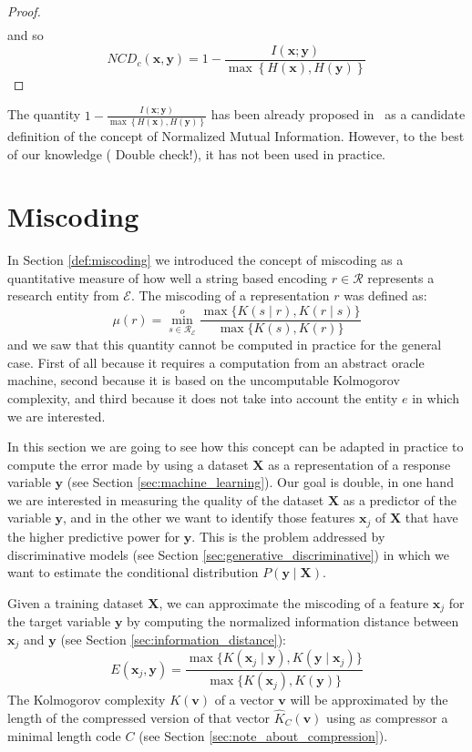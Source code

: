 \begin{proof}
\begin{align*}
\end{align*}
and so
\[
NCD_c\left(\mathbf{x},\mathbf{y}\right)=1-\frac{I\left(\mathbf{x};\mathbf{y}\right)}{\max\left\{ H\left(\mathbf{x}\right),H\left(\mathbf{y}\right)\right\} }
\]
\end{proof}

The quantity $1 - \frac{I\left(\mathbf{x};\mathbf{y}\right)}{\max\left\{ H\left(\mathbf{x}\right),H\left(\mathbf{y}\right)\right\} }$ has been already proposed in~\cite{ferri2009experimental} as a candidate definition of the concept of Normalized Mutual Information. However, to the best of our knowledge ({\color{red} Double check!}), it has not been used in practice.

%
%

\section{Miscoding}
\label{sec:machine_learning_miscoding}

In Section \ref{def:miscoding} we introduced the concept of miscoding as a quantitative measure of how well a string based encoding $r \in \mathcal{R}$ represents a research entity from $\mathcal{E}$. The miscoding of a representation $r$ was defined as:
\[
\mu(r) = \overset{o}{ \underset{s \in \mathcal{R}_\mathcal{E}} \min} \frac{ \max\{ K(s \mid r), K(r \mid s) \} } { \max\{ K(s), K(r) \} }
\]
and we saw that this quantity cannot be computed in practice for the general case. First of all because it requires a computation from an abstract oracle machine, second because it is based on the uncomputable Kolmogorov complexity, and third because it does not take into account the entity $e$ in which we are interested. 

In this section we are going to see how this concept can be adapted in practice to compute the error made by using a dataset $\mathbf{X}$ as a representation of a response variable $\mathbf{y}$ (see Section \ref{sec:machine_learning}). Our goal is double, in one hand we are interested in measuring the quality of the dataset $\mathbf{X}$ as a predictor of the variable $\mathbf{y}$, and in the other we want to identify those features $\mathbf{x}_j$ of $\mathbf{X}$ that have the higher predictive power for $\mathbf{y}$. This is the problem addressed by discriminative models (see Section \ref{sec:generative_discriminative}) in which we want to estimate the conditional distribution $P( \mathbf{y} \mid \mathbf{X} )$.

Given a training dataset $\mathbf{X}$, we can approximate the miscoding of a feature $\mathbf{x}_j$ for the target variable $\mathbf{y}$ by computing the normalized information distance between $\mathbf{x}_j$ and $\mathbf{y}$ (see Section \ref{sec:information_distance}):
\[
E(\mathbf{x}_j, \mathbf{y}) = \frac{\max\{ K(\mathbf{x}_j \mid \mathbf{y}), K(\mathbf{y} \mid \mathbf{x}_j) \}}{\max \{ K(\mathbf{x}_j), K(\mathbf{y}) \} }
\]
The Kolmogorov complexity $K(\mathbf{v})$ of a vector $\mathbf{v}$ will be approximated by the length of the compressed version of that vector $\hat{K}_C(\mathbf{v})$ using as compressor a minimal length code $C$ (see Section \ref{sec:note_about_compression}).

